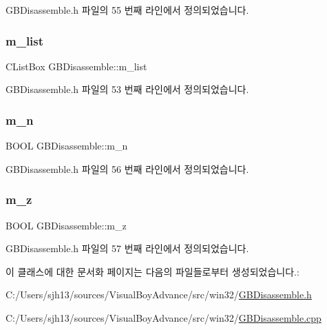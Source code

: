 G\+B\+Disassemble.\+h 파일의 55 번째 라인에서 정의되었습니다.

\mbox{\label{class_g_b_disassemble_a9c85552a373d70a612231c68d2702658}} 
\subsubsection{\texorpdfstring{m\+\_\+list}{m\_list}}
{\footnotesize\ttfamily C\+List\+Box G\+B\+Disassemble\+::m\+\_\+list}



G\+B\+Disassemble.\+h 파일의 53 번째 라인에서 정의되었습니다.

\mbox{\label{class_g_b_disassemble_acd44f179ab1fc59a252e21370ce183e9}} 
\subsubsection{\texorpdfstring{m\+\_\+n}{m\_n}}
{\footnotesize\ttfamily B\+O\+OL G\+B\+Disassemble\+::m\+\_\+n}



G\+B\+Disassemble.\+h 파일의 56 번째 라인에서 정의되었습니다.

\mbox{\label{class_g_b_disassemble_a3fe7947162446aea8ba1dcb1e6920b60}} 
\subsubsection{\texorpdfstring{m\+\_\+z}{m\_z}}
{\footnotesize\ttfamily B\+O\+OL G\+B\+Disassemble\+::m\+\_\+z}



G\+B\+Disassemble.\+h 파일의 57 번째 라인에서 정의되었습니다.



이 클래스에 대한 문서화 페이지는 다음의 파일들로부터 생성되었습니다.\+:\begin{DoxyCompactItemize}
\item 
C\+:/\+Users/sjh13/sources/\+Visual\+Boy\+Advance/src/win32/\mbox{\hyperlink{_g_b_disassemble_8h}{G\+B\+Disassemble.\+h}}\item 
C\+:/\+Users/sjh13/sources/\+Visual\+Boy\+Advance/src/win32/\mbox{\hyperlink{_g_b_disassemble_8cpp}{G\+B\+Disassemble.\+cpp}}\end{DoxyCompactItemize}
